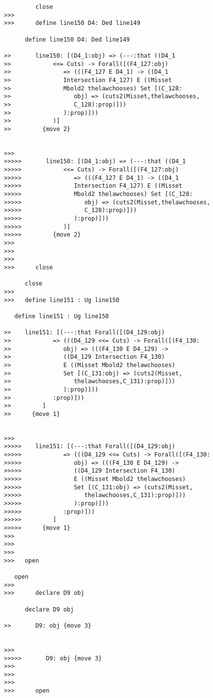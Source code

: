\documentclass[12pt]{article}
\begin{document}
\begin{verbatim}
         close
>>>
>>>      define line150 D4: Ded line149

      define line150 D4: Ded line149

>>       line150: [(D4_1:obj) => (---:that ((D4_1
>>            <<= Cuts) -> Forall([(F4_127:obj)
>>               => (((F4_127 E D4_1) -> ((D4_1
>>               Intersection F4_127) E ((Misset
>>               Mbold2 thelawchooses) Set [(C_128:
>>                  obj) => (cuts2(Misset,thelawchooses,
>>                  C_128):prop)]))
>>               ):prop)]))
>>            )]
>>         {move 2}


>>>
>>>>>       line150: [(D4_1:obj) => (---:that ((D4_1
>>>>>            <<= Cuts) -> Forall([(F4_127:obj)
>>>>>               => (((F4_127 E D4_1) -> ((D4_1
>>>>>               Intersection F4_127) E ((Misset
>>>>>               Mbold2 thelawchooses) Set [(C_128:
>>>>>                  obj) => (cuts2(Misset,thelawchooses,
>>>>>                  C_128):prop)]))
>>>>>               ):prop)]))
>>>>>            )]
>>>>>         {move 2}
>>>
>>>
>>>
>>>      close

      close
>>>
>>>   define line151 : Ug line150

   define line151 : Ug line150

>>    line151: [(---:that Forall([(D4_129:obj)
>>            => (((D4_129 <<= Cuts) -> Forall([(F4_130:
>>               obj) => (((F4_130 E D4_129) ->
>>               ((D4_129 Intersection F4_130)
>>               E ((Misset Mbold2 thelawchooses)
>>               Set [(C_131:obj) => (cuts2(Misset,
>>                  thelawchooses,C_131):prop)]))
>>               ):prop)]))
>>            :prop)]))
>>         ]
>>      {move 1}


>>>
>>>>>    line151: [(---:that Forall([(D4_129:obj)
>>>>>            => (((D4_129 <<= Cuts) -> Forall([(F4_130:
>>>>>               obj) => (((F4_130 E D4_129) ->
>>>>>               ((D4_129 Intersection F4_130)
>>>>>               E ((Misset Mbold2 thelawchooses)
>>>>>               Set [(C_131:obj) => (cuts2(Misset,
>>>>>                  thelawchooses,C_131):prop)]))
>>>>>               ):prop)]))
>>>>>            :prop)]))
>>>>>         ]
>>>>>      {move 1}
>>>
>>>
>>>
>>>   open

   open
>>>
>>>      declare D9 obj

      declare D9 obj

>>       D9: obj {move 3}


>>>
>>>>>       D9: obj {move 3}
>>>
>>>
>>>
>>>      open


\end{verbatim}
\end{document}
